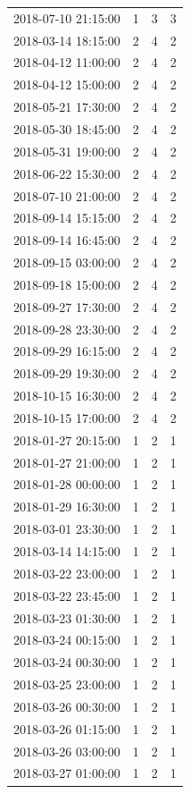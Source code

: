 \begin{tabular}{lrrr}
2018-07-10 21:15:00 & 1 & 3 & 3 \\
2018-03-14 18:15:00 & 2 & 4 & 2 \\
2018-04-12 11:00:00 & 2 & 4 & 2 \\
2018-04-12 15:00:00 & 2 & 4 & 2 \\
2018-05-21 17:30:00 & 2 & 4 & 2 \\
2018-05-30 18:45:00 & 2 & 4 & 2 \\
2018-05-31 19:00:00 & 2 & 4 & 2 \\
2018-06-22 15:30:00 & 2 & 4 & 2 \\
2018-07-10 21:00:00 & 2 & 4 & 2 \\
2018-09-14 15:15:00 & 2 & 4 & 2 \\
2018-09-14 16:45:00 & 2 & 4 & 2 \\
2018-09-15 03:00:00 & 2 & 4 & 2 \\
2018-09-18 15:00:00 & 2 & 4 & 2 \\
2018-09-27 17:30:00 & 2 & 4 & 2 \\
2018-09-28 23:30:00 & 2 & 4 & 2 \\
2018-09-29 16:15:00 & 2 & 4 & 2 \\
2018-09-29 19:30:00 & 2 & 4 & 2 \\
2018-10-15 16:30:00 & 2 & 4 & 2 \\
2018-10-15 17:00:00 & 2 & 4 & 2 \\
2018-01-27 20:15:00 & 1 & 2 & 1 \\
2018-01-27 21:00:00 & 1 & 2 & 1 \\
2018-01-28 00:00:00 & 1 & 2 & 1 \\
2018-01-29 16:30:00 & 1 & 2 & 1 \\
2018-03-01 23:30:00 & 1 & 2 & 1 \\
2018-03-14 14:15:00 & 1 & 2 & 1 \\
2018-03-22 23:00:00 & 1 & 2 & 1 \\
2018-03-22 23:45:00 & 1 & 2 & 1 \\
2018-03-23 01:30:00 & 1 & 2 & 1 \\
2018-03-24 00:15:00 & 1 & 2 & 1 \\
2018-03-24 00:30:00 & 1 & 2 & 1 \\
2018-03-25 23:00:00 & 1 & 2 & 1 \\
2018-03-26 00:30:00 & 1 & 2 & 1 \\
2018-03-26 01:15:00 & 1 & 2 & 1 \\
2018-03-26 03:00:00 & 1 & 2 & 1 \\
2018-03-27 01:00:00 & 1 & 2 & 1 \\

\end{tabular}
